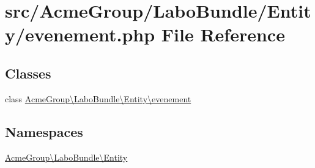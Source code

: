\hypertarget{_labo_bundle_2_entity_2evenement_8php}{\section{src/\+Acme\+Group/\+Labo\+Bundle/\+Entity/evenement.php File Reference}
\label{_labo_bundle_2_entity_2evenement_8php}
}
\subsection*{Classes}
\begin{DoxyCompactItemize}
\item 
class \hyperlink{class_acme_group_1_1_labo_bundle_1_1_entity_1_1evenement}{Acme\+Group\textbackslash{}\+Labo\+Bundle\textbackslash{}\+Entity\textbackslash{}evenement}
\end{DoxyCompactItemize}
\subsection*{Namespaces}
\begin{DoxyCompactItemize}
\item 
 \hyperlink{namespace_acme_group_1_1_labo_bundle_1_1_entity}{Acme\+Group\textbackslash{}\+Labo\+Bundle\textbackslash{}\+Entity}
\end{DoxyCompactItemize}
